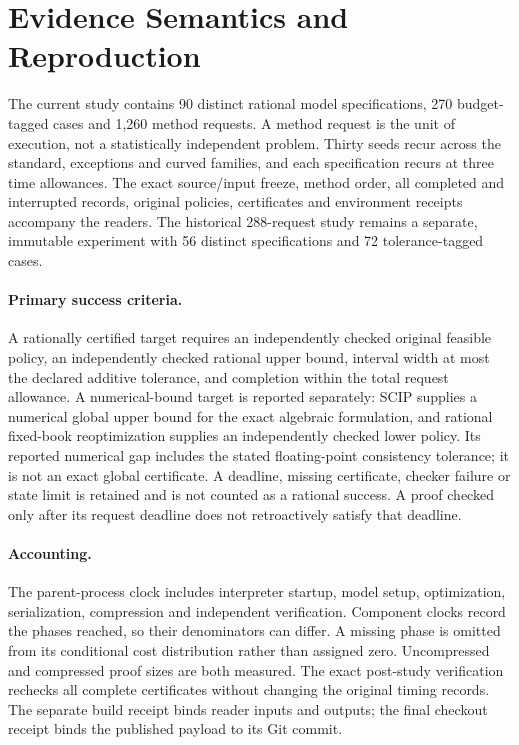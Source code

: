 \section{Evidence Semantics and Reproduction}\label{sec:evidence60}
The current study contains 90 distinct rational model specifications, 270 budget-tagged cases and 1,260 method requests. A method request is the unit of execution, not a statistically independent problem. Thirty seeds recur across the standard, exceptions and curved families, and each specification recurs at three time allowances. The exact source/input freeze, method order, all completed and interrupted records, original policies, certificates and environment receipts accompany the readers. The historical 288-request study remains a separate, immutable experiment with 56 distinct specifications and 72 tolerance-tagged cases.

\paragraph{Primary success criteria.} A rationally certified target requires an independently checked original feasible policy, an independently checked rational upper bound, interval width at most the declared additive tolerance, and completion within the total request allowance. A numerical-bound target is reported separately: SCIP supplies a numerical global upper bound for the exact algebraic formulation, and rational fixed-book reoptimization supplies an independently checked lower policy. Its reported numerical gap includes the stated floating-point consistency tolerance; it is not an exact global certificate. A deadline, missing certificate, checker failure or state limit is retained and is not counted as a rational success. A proof checked only after its request deadline does not retroactively satisfy that deadline.

\paragraph{Accounting.} The parent-process clock includes interpreter startup, model setup, optimization, serialization, compression and independent verification. Component clocks record the phases reached, so their denominators can differ. A missing phase is omitted from its conditional cost distribution rather than assigned zero. Uncompressed and compressed proof sizes are both measured. The exact post-study verification rechecks all complete certificates without changing the original timing records. The separate build receipt binds reader inputs and outputs; the final checkout receipt binds the published payload to its Git commit.

